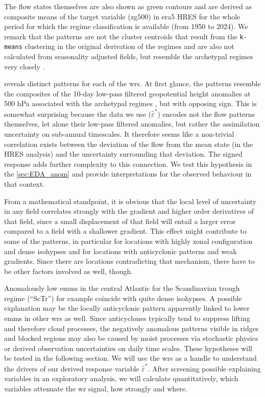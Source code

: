 The flow states themselves are also shown as green contours and are derived as composite means of the target variable (\gls{zg500}) in \gls{era5} HRES for the whole period for which the regime classification is available (from 1950 to 2024). We remark that the patterns are not the cluster centroids that result from the \texttt{k-means} clustering in the original derivation of the regimes and are also not calculated from seasonality adjusted fields, but resemble the archetypal regimes very closely \parencite{gramsLifeCycleDefinition2026}.

 reveals distinct patterns for each of the \glspl{wr}. At first glance, the patterns resemble the composites of the 10-day low-pass filtered geopotential height anomalies at 500 hPa associated with the archetypal regimes \parencite{gramsLifeCycleDefinition2026}, but with opposing sign. This is somewhat surprising because the data we use ($\hat{\varepsilon}^{\ast}$) encodes not the flow patterns themselves, let alone their low-pass filtered anomalies, but rather the assimilation uncertainty on sub-annual timescales. It therefore seems like a non-trivial correlation exists between the deviation of the flow from the mean state (in the HRES analysis) and the uncertainty surrounding that deviation. The signed response adds further complexity to this connection. We test this hypothesis in the \cref{sec:EDA_anom} and provide interpretations for the observed behaviour in that context.

From a mathematical standpoint, it is obvious that the local level of uncertainty in any field correlates strongly with the gradient and higher order derivatives of
that field, since a small displacement of that field will entail a larger error compared to a field with a shallower gradient. This effect might contribute to some of the patterns, in particular for locations with highly zonal configuration and dense isohypses and for locations with anticyclonic patterns and weak gradients. Since there are locations contradicting that mechanism, there have to be other factors involved as well, though.

Anomalously low \glspl{emm} in the central Atlantic for the Scandinavian trough regime (\enquote{ScTr}) for example coincide with quite dense isohypses. A possible explanation may be the locally anticyclonic pattern apparently linked to lower \glspl{emm} in other \glspl{wr} as well. Since anticyclones typically tend to suppress lifting and therefore cloud processes, the negatively anomalous patterns visible in ridges and blocked regions may also be caused by moist processes via stochastic physics or derived observation uncertainties on daily time scales. These hypotheses will be tested in the following section. We will use the \glspl{wr} as a handle to understand the drivers of our derived response variable $\hat{\varepsilon}^*$. After screening possible explaining variables in an exploratory analysis, we will calculate quantitatively, which variables attenuate the \gls{wr} signal, how strongly and where.


